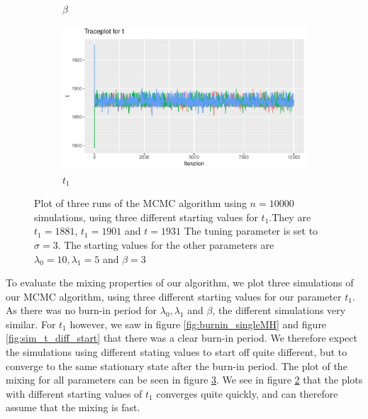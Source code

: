 \begin{figure}[H]
\begin{subfigure}[b]{0.49\textwidth}
        \caption{$\beta$ }
        \label{fig:sim_mixing_beta}
    \end{subfigure}
    \begin{subfigure}[b]{0.49\textwidth}
        \centering
        \includegraphics[width = \textwidth]{Images/mixing_t.pdf}
        \caption{$t_1$}
        \label{fig:sim_mixing_t}
    \end{subfigure}
    \caption{Plot of three runs of the MCMC algorithm using $n = 10000$ simulations, using three different starting values for $t_1$.They are $t_1 = 1881$, $t_1 = 1901$ and $t = 1931$ The tuning parameter is set to $\sigma = 3$. The starting values for the other parameters are $\lambda_0 = 10, \lambda_1 = 5$ and $\beta = 3$}
    \label{fig:sim_mixing}
\end{figure}





To evaluate the mixing properties of our algorithm, we plot three simulations of our MCMC algorithm, using three different starting values for our parameter $t_1$. As there was no burn-in period for $\lambda_0, \lambda_1$ and $\beta$, the different simulations very similar. For $t_1$ however, we saw in figure \ref{fig:burnin_singleMH} and figure \ref{fig:sim_t_diff_start} that there was a clear burn-in period. We therefore expect the simulations using different stating values to start off quite different, but to converge to the same stationary state after the burn-in period. The plot of the mixing for all parameters can be seen in figure \ref{fig:sim_mixing}. We see in figure \ref{fig:sim_mixing_t} that the plots with different starting values of $t_1$ converges quite quickly, and can therefore assume that the mixing is fast. 




